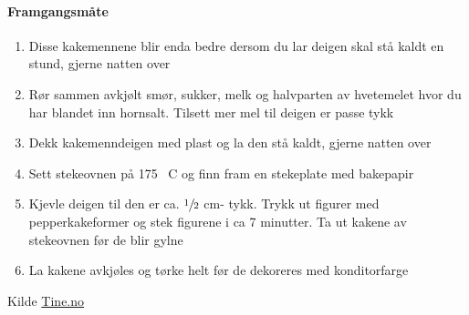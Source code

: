 \paragraph{Framgangsmåte}
\begin{enumerate}[noitemsep]
	\item Disse kakemennene blir enda bedre dersom du lar deigen skal stå kaldt en stund, gjerne natten over
	\item Rør sammen avkjølt smør, sukker, melk og halvparten av hvetemelet hvor du har blandet inn hornsalt. Tilsett mer mel til deigen er passe tykk
	\item Dekk kakemenndeigen med plast og la den stå kaldt, gjerne natten over
	\item Sett stekeovnen på 175 \degree~C og finn fram en stekeplate med bakepapir
	\item Kjevle deigen til den er ca. $\sfrac{1}{2}$ cm- tykk. Trykk ut figurer med pepperkakeformer og stek figurene i ca 7 minutter. Ta ut kakene av stekeovnen før de blir gylne
	\item La kakene avkjøles og tørke helt før de dekoreres med konditorfarge
\end{enumerate}


Kilde \href{http://www.tine.no/oppskrifter/kaker/vafler-og-smakaker/8721.cms?hvite-kakemenn-(og--damer)}{Tine.no}
